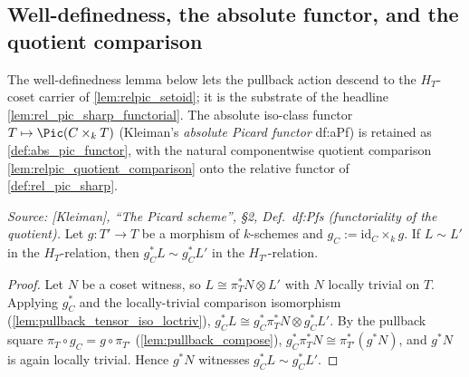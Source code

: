 \subsection{Well-definedness, the absolute functor, and the quotient comparison}
\label{subsec:relpic_relative_functor}


The well-definedness lemma below lets the pullback action descend to the
\(H_T\)-coset carrier of \cref{lem:relpic_setoid}; it is the substrate of
the headline \cref{lem:rel_pic_sharp_functorial}. The absolute iso-class
functor \(T \mapsto \Pic(C \times_k T)\) (Kleiman's \emph{absolute Picard
functor} df:aPf) is retained as \cref{def:abs_pic_functor}, with the
natural componentwise quotient comparison
\cref{lem:relpic_quotient_comparison} onto the relative functor of
\cref{def:rel_pic_sharp}.

\begin{lemma}
  \label{lem:relpic_pullback_welldef}
  \textit{Source: [Kleiman], ``The Picard scheme'', \S 2, Def.~df:Pfs
  (functoriality of the quotient).}
  Let \(g : T' \to T\) be a morphism of \(k\)-schemes and
  \(g_C := \mathrm{id}_C \times_k g\). If \(L \sim L'\) in the
  \(H_T\)-relation, then \(g_C^* L \sim g_C^* L'\) in the
  \(H_{T'}\)-relation.
\end{lemma}

\begin{proof}\leanok
  Let \(N\) be a coset witness, so \(L \cong \pi_T^* N \otimes L'\) with
  \(N\) locally trivial on \(T\). Applying \(g_C^*\) and the locally-trivial
  comparison isomorphism (\cref{lem:pullback_tensor_iso_loctriv}),
  \(g_C^* L \cong g_C^* \pi_T^* N \otimes g_C^* L'\). By the pullback square
  \(\pi_T \circ g_C = g \circ \pi_{T'}\) (\cref{lem:pullback_compose}),
  \(g_C^* \pi_T^* N \cong \pi_{T'}^* (g^* N)\), and \(g^* N\) is again
  locally trivial. Hence \(g^* N\) witnesses \(g_C^* L \sim g_C^* L'\).
\end{proof}

